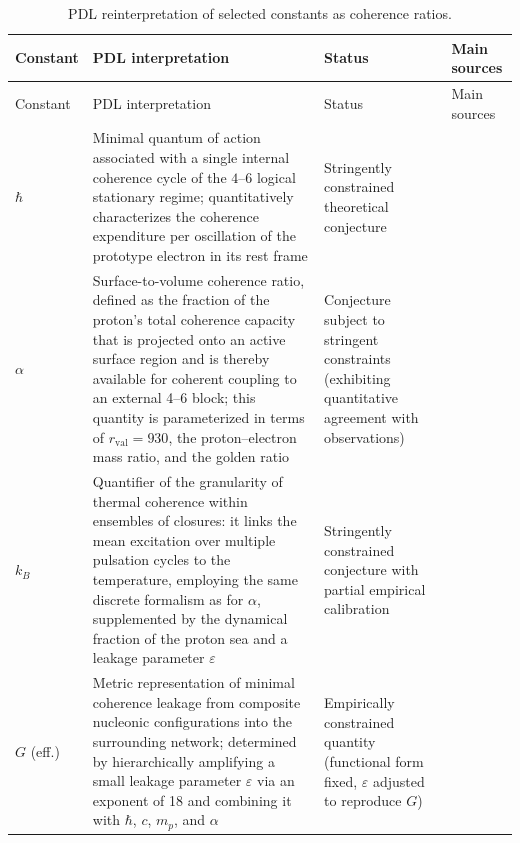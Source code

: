 \documentclass{article}
\begin{document}
\begin{longtable}{@{}p{1.5cm}p{6cm}L{4.5cm}p{2.5cm}@{}}
  \caption{PDL reinterpretation of selected constants as coherence ratios.}
  \label{tab:constants_status}\\

  \toprule
  Constant & PDL interpretation & Status & Main sources \\
  \midrule
  \endfirsthead

  \toprule
  Constant & PDL interpretation & Status & Main sources \\
  \midrule
  \endhead

  \bottomrule
  \endfoot

  $\hbar$ &
  Minimal quantum of action associated with a single internal coherence cycle of the $4$--$6$ logical stationary regime; quantitatively characterizes the coherence expenditure per oscillation of the prototype electron in its rest frame &
  Stringently constrained theoretical conjecture &
  \citep{PDL_Main_2026,PDL_intro,PDL_position} \\[0.4em]

  $\alpha$ & Surface-to-volume coherence ratio, defined as the fraction of the proton’s total coherence capacity that is projected onto an active surface region and is thereby available for coherent coupling to an external 4–6 block; this quantity is parameterized in terms of $r_{\mathrm{val}} = 930$, the proton–electron mass ratio, and the golden ratio & 
  Conjecture subject to stringent constraints (exhibiting quantitative agreement with observations) &
  \citep{Alpha_PDL_v2_2026,PDL_intro,Born_Golden_v2_2026} \\[0.4em]

  $k_B$ &
  Quantifier of the granularity of thermal coherence within ensembles of closures: it links the mean excitation over multiple pulsation cycles to the temperature, employing the same discrete formalism as for $\alpha$, supplemented by the dynamical fraction of the proton sea and a leakage parameter $\varepsilon$ &
  Stringently constrained conjecture with partial empirical calibration &
  \citep{PDL_Main_2026,Coherence_Leakage_18_2026,PDL_position} \\[0.4em]

  $G$ (eff.) &
  Metric representation of minimal coherence leakage from composite nucleonic configurations into the surrounding network; determined by hierarchically amplifying a small leakage parameter $\varepsilon$ via an exponent of 18 and combining it with $\hbar$, $c$, $m_p$, and $\alpha$ &
  Empirically constrained quantity (functional form fixed, $\varepsilon$ adjusted to reproduce $G$) &
  \citep{PDL_Main_2026,Exponent_18_PDL_2026,Coherence_Leakage_18_2026,PDL_position} \\

\end{longtable}
\end{document}
